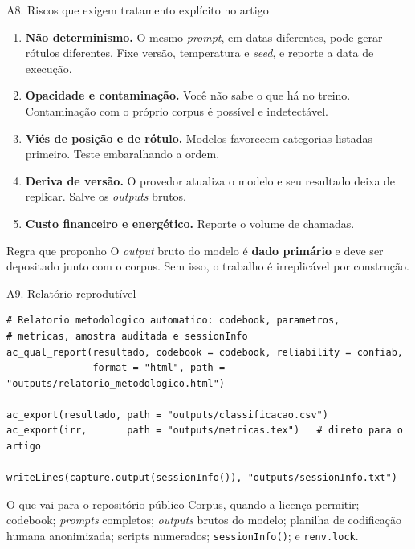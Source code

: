 \documentclass[11pt,aspectratio=169]{beamer}
\begin{document}
\begin{frame}{A8. Riscos que exigem tratamento explícito no artigo}
\begin{enumerate}\small
  \item \textbf{Não determinismo.} O mesmo \emph{prompt}, em datas diferentes,
        pode gerar rótulos diferentes. Fixe versão, temperatura e \emph{seed},
        e reporte a data de execução.
  \vspace{0.1cm}
  \item \textbf{Opacidade e contaminação.} Você não sabe o que há no treino.
        Contaminação com o próprio corpus é possível e indetectável.
  \vspace{0.1cm}
  \item \textbf{Viés de posição e de rótulo.} Modelos favorecem categorias
        listadas primeiro. Teste embaralhando a ordem.
  \vspace{0.1cm}
  \item \textbf{Deriva de versão.} O provedor atualiza o modelo e seu resultado
        deixa de replicar. Salve os \emph{outputs} brutos.
  \vspace{0.1cm}
  \item \textbf{Custo financeiro e energético.} Reporte o volume de chamadas.
\end{enumerate}
\vspace{0.2cm}
\begin{block}{Regra que proponho}
\footnotesize O \emph{output} bruto do modelo é \textbf{dado primário} e deve ser
depositado junto com o corpus. Sem isso, o trabalho é irreplicável por
construção.
\end{block}
\end{frame}

\begin{frame}[fragile]{A9. Relatório reprodutível}
\begin{lstlisting}
# Relatorio metodologico automatico: codebook, parametros,
# metricas, amostra auditada e sessionInfo
ac_qual_report(resultado, codebook = codebook, reliability = confiab,
               format = "html", path = "outputs/relatorio_metodologico.html")

ac_export(resultado, path = "outputs/classificacao.csv")
ac_export(irr,       path = "outputs/metricas.tex")   # direto para o artigo

writeLines(capture.output(sessionInfo()), "outputs/sessionInfo.txt")
\end{lstlisting}
\vspace{0.2cm}
\begin{block}{O que vai para o repositório público}
\small
Corpus, quando a licença permitir; codebook; \emph{prompts} completos;
\emph{outputs} brutos do modelo; planilha de codificação humana anonimizada;
scripts numerados; \texttt{sessionInfo()}; e \texttt{renv.lock}.
\end{block}
\end{frame}
\end{document}
